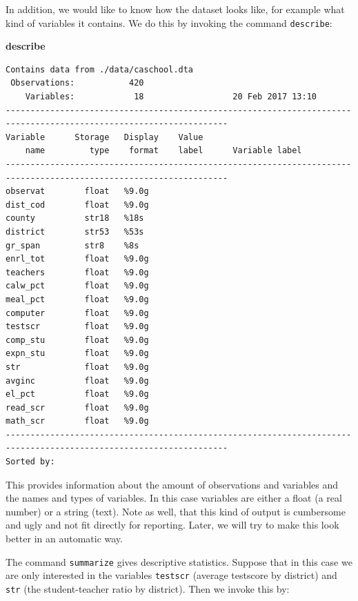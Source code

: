 \documentclass[
]{book}
\newenvironment{Shaded}{\begin{snugshade}}{\end{snugshade}}
\newcommand{\KeywordTok}[1]{\textcolor[rgb]{0.13,0.29,0.53}{\textbf{#1}}}
\begin{document}
In addition, we would like to know how the dataset looks like, for example what kind of variables it contains. We do this by invoking the command \texttt{describe}:

\begin{Shaded}
\begin{Highlighting}[]
\KeywordTok{describe}
\end{Highlighting}
\end{Shaded}

\begin{verbatim}
Contains data from ./data/caschool.dta
 Observations:           420                  
    Variables:            18                  20 Feb 2017 13:10
-------------------------------------------------------------------------------------------------------------------
Variable      Storage   Display    Value
    name         type    format    label      Variable label
-------------------------------------------------------------------------------------------------------------------
observat        float   %9.0g                 
dist_cod        float   %9.0g                 
county          str18   %18s                  
district        str53   %53s                  
gr_span         str8    %8s                   
enrl_tot        float   %9.0g                 
teachers        float   %9.0g                 
calw_pct        float   %9.0g                 
meal_pct        float   %9.0g                 
computer        float   %9.0g                 
testscr         float   %9.0g                 
comp_stu        float   %9.0g                 
expn_stu        float   %9.0g                 
str             float   %9.0g                 
avginc          float   %9.0g                 
el_pct          float   %9.0g                 
read_scr        float   %9.0g                 
math_scr        float   %9.0g                 
-------------------------------------------------------------------------------------------------------------------
Sorted by: 
\end{verbatim}

This provides information about the amount of observations and variables and the names and types of variables. In this case variables are either a float (a real number) or a string (text). Note as well, that this kind of output is cumbersome and ugly and not fit directly for reporting. Later, we will try to make this look better in an automatic way.

The command \texttt{summarize} gives descriptive statistics. Suppose that in this case we are only interested in the variables \texttt{testscr} (average testscore by district) and \texttt{str} (the student-teacher ratio by district). Then we invoke this by:
\end{document}
